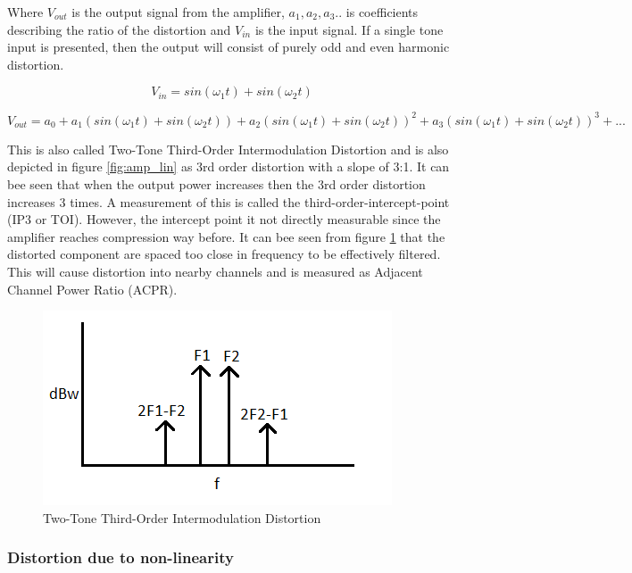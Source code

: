 Where $V_{out}$ is the output signal from the amplifier, $a_1, a_2 ,a_3..$ is coefficients describing the ratio of the distortion and $V_{in}$ is the input signal. If a single tone input is presented, then the output will consist of purely odd and even harmonic distortion. 

\begin{equation}\label{eq:dest1}
V_{in} = sin(\omega_1 t) + sin(\omega_2 t)
\end{equation} 

\begin{equation} \label{eq:dest2}
V_{out} = a_0 + a_1 (sin(\omega_1 t) + sin(\omega_2 t)) + a_2 (sin(\omega_1 t) + sin(\omega_2 t))^2 + a_3 (sin(\omega_1 t) + sin(\omega_2 t))^3 + ... 
\end{equation}

This is also called Two-Tone Third-Order Intermodulation Distortion and is also depicted in figure \ref{fig:amp_lin} as 3rd order distortion with a slope of 3:1. It can bee seen that when the output power increases then the 3rd order distortion increases 3 times. A measurement of this is called the third-order-intercept-point (IP3 or TOI). However, the intercept point it not directly measurable since the amplifier reaches compression way before. It can bee seen from figure \ref{fig:amp_psd} that the distorted component are spaced too close in frequency to be effectively filtered. This will cause distortion into nearby channels and is measured as Adjacent Channel Power Ratio (ACPR).

\begin{figure}[H]
\centering 
\includegraphics[scale = 0.7]{figures/ch1/amp_psd.png}
\caption{Two-Tone Third-Order Intermodulation Distortion}
\label{fig:amp_psd}
\end{figure}

\subsubsection{Distortion due to non-linearity}


